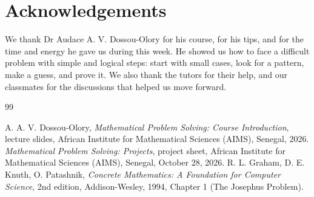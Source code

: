 \documentclass[12pt,a4paper]{article}
\begin{document}
\setcounter{tocdepth}{2}
\tableofcontents
\newpage


\clearpage

\clearpage

\clearpage

\clearpage

\clearpage

\clearpage


\clearpage
\section*{Acknowledgements}
We thank Dr Audace A. V. Dossou-Olory for his course, for his tips, and for
the time and energy he gave us during this week. He showed us how to face a
difficult problem with simple and logical steps: start with small cases, look
for a pattern, make a guess, and prove it. We also thank the tutors for their
help, and our classmates for the discussions that helped us move forward.

{\footnotesize
\begin{thebibliography}{99}
 A. A. V. Dossou-Olory, \emph{Mathematical Problem
Solving: Course Introduction}, lecture slides, African Institute for
Mathematical Sciences (AIMS), Senegal, 2026.
 \emph{Mathematical Problem Solving: Projects},
project sheet, African Institute for Mathematical Sciences (AIMS), Senegal,
October 28, 2026.
 R. L. Graham, D. E. Knuth, O. Patashnik, \emph{Concrete
Mathematics: A Foundation for Computer Science}, 2nd edition, Addison-Wesley,
1994, Chapter 1 (The Josephus Problem).
\end{thebibliography}
}
\end{document}
